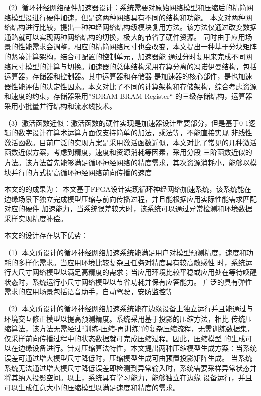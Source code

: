 （2）循环神经网络硬件加速器设计：系统需要对原始网络模型和压缩后的精简网络模型设进行硬件加速，但是这两种网络具有不同的结构和功能。
本文对两种网络结构进行比较，提出一种神经网络结构级模块复用方法。该方法仅通过改变数据通路就可以实现两种网络结构的切换，极大的节省了硬件资源。
同时由于应用场景的性能需求会调整，相应的精简网络尺寸也会改变，本文提出一种基于分块矩阵的紧凑计算架构，结合可配置的控制单元，加速器能
通过分时复用来完成不同网络尺寸模型的计算与切换。加速器的总体结构采用存算分离的冯诺伊曼结构，包括运算器，存储器和控制器。其中运算器和存储器
是加速器的核心部件，是也加速器性能评估的决定性因素。本文对比了不同的计算架构和存储架构，综合考虑资源和速度的约束，存储器采用”SDRAM-BRAM-Register“
的三级存储结构，运算器采用小批量并行结构和流水线技术。

（3）激活函数近似：激活函数的硬件实现是加速器设计重要部分，但是基于0-1逻辑的数字设计在算术运算方面仅支持简单的加法，乘法等，不能直接实现
非线性激活函数。目前广泛的实现方案是采用激活函数近似，本文对比了常见的几种激活函数近似方案，考虑到精度，速度和资源消耗等因素，采用分段
三阶函数近似的方法。该方法首先能够满足循环神经网络的精度需求，其次资源消耗小，能够以模块并行的方式提高循环神经网络前向传播的速度

本文的的成果为： 本文基于FPGA设计实现循环神经网络加速系统，该系统能在边缘场景下独立完成模型压缩与前向传播过程，并且能根据应用实际性能需求匹配对应的硬件
加速能力，当系统误差较大时，该系统可以通过异常检测和环境数据采样实现精度补偿。

本文的设计存在以下优势：

（1）本文所设计的循环神经网络加速系统能满足用户对模型预测精度，速度和功耗的多样化需求。当应用环境比较复杂且任务对精度具有较高敏感性
时，系统运行大尺寸网络模型以满足高精度的需求；当应用环境比较平稳或应用处在等待唤醒状态时，系统运行小尺寸网络模型以节省功耗并保有应答能力。
广泛的具有弹性需求的应用场景包括语音助手，自动驾驶，安防监控等　

（2）本文所设计的循环神经网络加速系统能在边缘设备上独立运行并且能通过与环境交互修正模型以提高预测精度。系统采用基于投影的压缩方法，相比
传统压缩算法，该方法无需经过“训练-压缩-再训练”的复杂压缩流程，无需训练数据集，仅采样前向传播过程中的状态数据就可完成压缩过程。因此，压缩模型
的生成可以在边缘设备进行。针对压缩算法特性，本文提出两种压缩模型生成方案：当系统误差可通过增大模型尺寸降低时，压缩模型生成可由预置投影矩阵生成。
当系统系统无法通过增大模尺寸降低误差即检测到异常输入时，系统需要采样异常状态并将其纳入投影空间。以上，系统具有学习能力，能够独立在边缘
设备运行，并且可以生成任意大小的压缩模型以满足速度和精度的需求。

